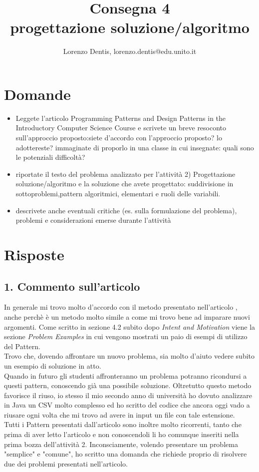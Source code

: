\documentclass[a4paper]{article}
\begin{document}
\author{Lorenzo Dentis, lorenzo.dentis@edu.unito.it}
\title{Consegna 4 \\ \large progettazione soluzione/algoritmo}
\maketitle

\section{Domande}
\begin{itemize}
	\item Leggete l'articolo Programming Patterns and Design Patterns in the Introductory Computer Science Course e scrivete un breve resoconto sull'approccio proposto:siete d'accordo con l'approccio proposto? lo adottereste? immaginate di proporlo in una classe in cui insegnate: quali sono le potenziali difficoltà?
	\item riportate il testo del problema analizzato per l'attività 2) Progettazione soluzione/algoritmo e la soluzione che avete progettato: suddivisione in sottoproblemi,pattern algoritmici, elementari e ruoli delle variabili.
	\item descrivete anche eventuali critiche (es. sulla formulazione del problema), problemi e considerazioni emerse durante l'attività
\end{itemize}
\section{Risposte}
\subsection{1. Commento sull'articolo}
In generale mi trovo molto d'accordo con il metodo presentato nell'articolo \cite{articolo}, anche perchè è un metodo molto simile a come mi trovo bene ad imparare nuovi argomenti.
Come scritto in sezione 4.2 subito dopo \textit{Intent and Motivation} viene la sezione \textit{Problem Examples} in cui vengono mostrati un paio di esempi di utilizzo del Pattern.\\
Trovo che, dovendo affrontare un nuovo problema, sia molto d'aiuto vedere subito un esempio di soluzione in atto.\\
Quando in futuro gli studenti affronteranno un problema potranno ricondursi a questi pattern, conoscendo già una possibile soluzione. Oltretutto questo metodo favorisce il riuso, io stesso il mio secondo anno di università ho dovuto analizzare in Java un CSV molto complesso ed ho scritto del codice che ancora oggi vado a riusare ogni volta che mi trovo ad avere in input un file con tale estensione.\\
Tutti i Pattern presentati dall'articolo sono inoltre molto ricorrenti, tanto che prima di aver letto l'articolo e non conoscendoli li ho comunque inseriti nella prima bozza dell'attività 2. Inconsciamente, volendo presentare un problema "semplice" e "comune", ho scritto una domanda che richiede proprio di risolvere due dei problemi presentati nell'articolo.
\end{document}
